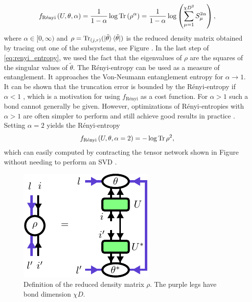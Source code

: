 \begin{equation}
	\label{eq:renyi_entropy}
	f_\text{Rényi}\left(U,\theta,\alpha\right) = \frac{1}{1-\alpha}\log\operatorname{Tr}\left(\rho^\alpha\right) = \frac{1}{1-\alpha}\log\left(\sum_{\mu=1}^{\chi D^2}S_\mu^{2\alpha}\right),
\end{equation}
where $\alpha\in[0,\infty)$ and $\rho = \operatorname{Tr}_{(j, r)}(\ket{\tilde{\theta}}\bra{\tilde{\theta}})$ is the reduced density matrix obtained by tracing out one of the subsystems, see Figure . 
In the last step of \eqref{eq:renyi_entropy}, we used the fact that the eigenvalues of $\rho$ are the squares of the singular values of $\tilde{\theta}$. The Rényi-entropy can be used as a measure of entanglement. It approaches the Von-Neumann entanglement entropy for $\alpha\rightarrow 1$. It can be shown that the truncation error is bounded by the Rényi-entropy if $\alpha < 1$ \cite{cite:mps_represent_ground_states_faithfully}, which is a motivation for using $f_\text{Rényi}$ as a cost function. For $\alpha > 1$ such a bond cannot generally be given. However, optimizations of Rényi-entropies with $\alpha > 1$ are often simpler to perform and still achieve good results in practice \cite{cite:isometric_tensor_network_states_in_two_dimensions, cite:efficient_simulation_of_dynamics_in_two_dimensional_quantum_spin_systems, cite:finding_purifications_with_minimal_entanglement}. Setting $\alpha = 2$ yields the Rényi-entropy
\begin{equation}
	\label{eq:renyi_entropy_alpha_2}
	f_\text{Rényi}\left(U,\theta,\alpha=2\right) = -\log\operatorname{Tr}\rho^2,
\end{equation}
which can easily computed by contracting the tensor network shown in Figure  without needing to perform an SVD \cite{cite:finding_purifications_with_minimal_entanglement}. 
\begin{figure}
	\centering
	\includegraphics[scale=1]{figures/tikz/YB_isoTPS/rho_definition/rho_definition.pdf}
	\caption{Definition of the reduced density matrix $\rho$. The purple legs have bond dimension $\chi D$.}
	\label{fig:disentangling_rho_definition}
\end{figure}
